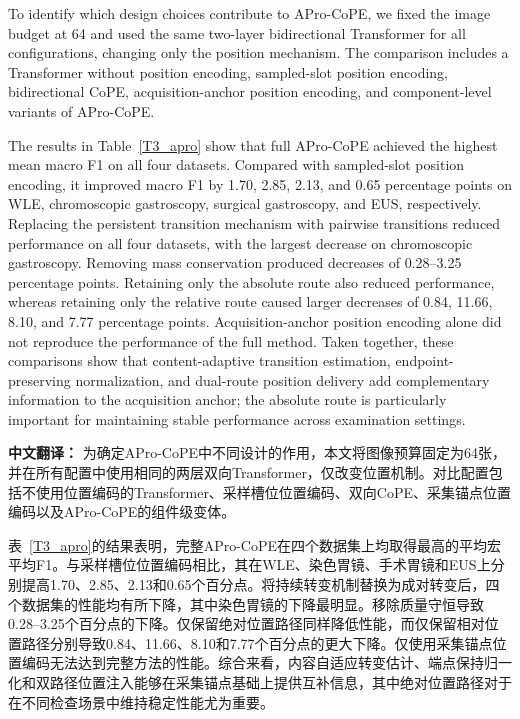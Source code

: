 \documentclass[Afour,sagev,times]{sagej}
\begin{document}
To identify which design choices contribute to APro-CoPE, we fixed the image budget at 64 and used the same two-layer bidirectional Transformer for all configurations, changing only the position mechanism. The comparison includes a Transformer without position encoding, sampled-slot position encoding, bidirectional CoPE, acquisition-anchor position encoding, and component-level variants of APro-CoPE.

The results in Table~\ref{T3_apro} show that full APro-CoPE achieved the highest mean macro F1 on all four datasets. Compared with sampled-slot position encoding, it improved macro F1 by 1.70, 2.85, 2.13, and 0.65 percentage points on WLE, chromoscopic gastroscopy, surgical gastroscopy, and EUS, respectively. Replacing the persistent transition mechanism with pairwise transitions reduced performance on all four datasets, with the largest decrease on chromoscopic gastroscopy. Removing mass conservation produced decreases of 0.28--3.25 percentage points. Retaining only the absolute route also reduced performance, whereas retaining only the relative route caused larger decreases of 0.84, 11.66, 8.10, and 7.77 percentage points. Acquisition-anchor position encoding alone did not reproduce the performance of the full method. Taken together, these comparisons show that content-adaptive transition estimation, endpoint-preserving normalization, and dual-route position delivery add complementary information to the acquisition anchor; the absolute route is particularly important for maintaining stable performance across examination settings.

\textbf{中文翻译：} 为确定APro-CoPE中不同设计的作用，本文将图像预算固定为64张，并在所有配置中使用相同的两层双向Transformer，仅改变位置机制。对比配置包括不使用位置编码的Transformer、采样槽位位置编码、双向CoPE、采集锚点位置编码以及APro-CoPE的组件级变体。

表~\ref{T3_apro}的结果表明，完整APro-CoPE在四个数据集上均取得最高的平均宏平均F1。与采样槽位位置编码相比，其在WLE、染色胃镜、手术胃镜和EUS上分别提高1.70、2.85、2.13和0.65个百分点。将持续转变机制替换为成对转变后，四个数据集的性能均有所下降，其中染色胃镜的下降最明显。移除质量守恒导致0.28--3.25个百分点的下降。仅保留绝对位置路径同样降低性能，而仅保留相对位置路径分别导致0.84、11.66、8.10和7.77个百分点的更大下降。仅使用采集锚点位置编码无法达到完整方法的性能。综合来看，内容自适应转变估计、端点保持归一化和双路径位置注入能够在采集锚点基础上提供互补信息，其中绝对位置路径对于在不同检查场景中维持稳定性能尤为重要。
\end{document}
